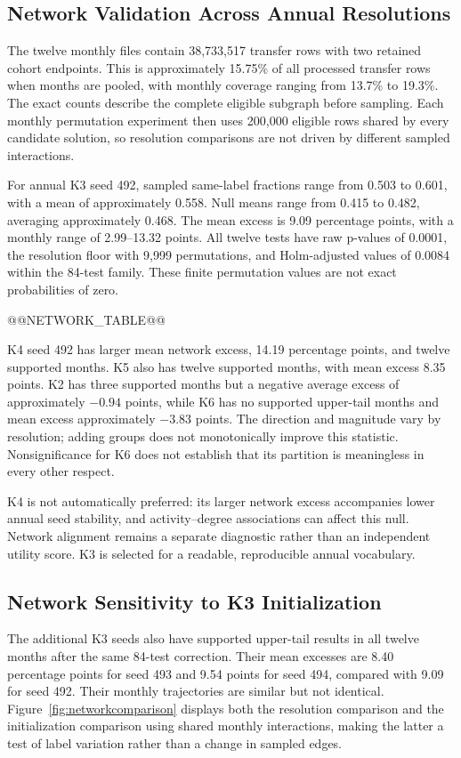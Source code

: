 \subsection{Network Validation Across Annual Resolutions}
The twelve monthly files contain 38,733,517 transfer rows with two retained cohort endpoints. This is approximately 15.75\% of all processed transfer rows when months are pooled, with monthly coverage ranging from 13.7\% to 19.3\%. The exact counts describe the complete eligible subgraph before sampling. Each monthly permutation experiment then uses 200,000 eligible rows shared by every candidate solution, so resolution comparisons are not driven by different sampled interactions.

For annual K3 seed 492, sampled same-label fractions range from 0.503 to 0.601, with a mean of approximately 0.558. Null means range from 0.415 to 0.482, averaging approximately 0.468. The mean excess is 9.09 percentage points, with a monthly range of 2.99--13.32 points. All twelve tests have raw p-values of 0.0001, the resolution floor with 9,999 permutations, and Holm-adjusted values of 0.0084 within the 84-test family. These finite permutation values are not exact probabilities of zero.

@@NETWORK_TABLE@@

K4 seed 492 has larger mean network excess, 14.19 percentage points, and twelve supported months. K5 also has twelve supported months, with mean excess 8.35 points. K2 has three supported months but a negative average excess of approximately $-0.94$ points, while K6 has no supported upper-tail months and mean excess approximately $-3.83$ points. The direction and magnitude vary by resolution; adding groups does not monotonically improve this statistic. Nonsignificance for K6 does not establish that its partition is meaningless in every other respect.

K4 is not automatically preferred: its larger network excess accompanies lower annual seed stability, and activity--degree associations can affect this null. Network alignment remains a separate diagnostic rather than an independent utility score. K3 is selected for a readable, reproducible annual vocabulary.

\subsection{Network Sensitivity to K3 Initialization}
The additional K3 seeds also have supported upper-tail results in all twelve months after the same 84-test correction. Their mean excesses are 8.40 percentage points for seed 493 and 9.54 points for seed 494, compared with 9.09 for seed 492. Their monthly trajectories are similar but not identical. Figure~\ref{fig:networkcomparison} displays both the resolution comparison and the initialization comparison using shared monthly interactions, making the latter a test of label variation rather than a change in sampled edges.

